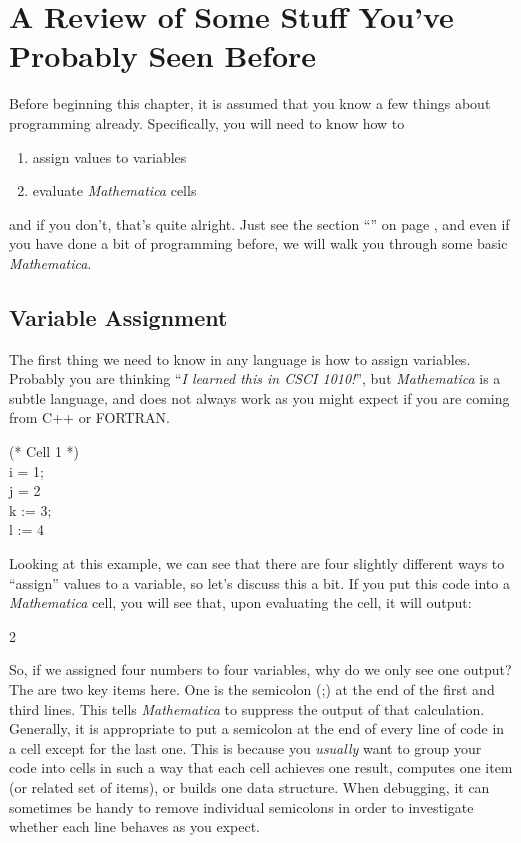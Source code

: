 \chapter[Stuff You've Seen Before]{A Review of Some Stuff You've Probably Seen Before}
\label{chap:SeenBefore}

Before beginning this chapter, it is assumed that you know a few things about programming already. Specifically, you will need to know how to
\begin{enumerate}
	   \item assign values to variables
	   \item evaluate \emph{Mathematica} cells
\end{enumerate}
and if you don't, that's quite alright. Just see the section ``\emph{}'' on page \pageref{chap:Prelim}, and even if you have done a bit of programming before, we will walk you through some basic \emph{Mathematica}.

\section{Variable Assignment}
The first thing we need to know in any language is how to assign variables. Probably you are thinking ``\emph{I learned this in CSCI 1010!}'', but \emph{Mathematica} is a subtle language, and does not always work as you might expect if you are coming from C++ or FORTRAN.

\begin{code}
	(* Cell 1 *)\\
	i = 1;\\
	j = 2\\
	k := 3;\\
	l := 4
\end{code}

Looking at this example, we can see that there are four slightly different ways to ``assign'' values to a variable, so let's discuss this a bit. If you put this code into a \emph{Mathematica} cell, you will see that, upon evaluating the cell, it will output:

\begin{code}
2
\end{code}

So, if we assigned four numbers to four variables, why do we only see one output? The are two key items here. One is the semicolon (;) at the end of the first and third lines. This tells \emph{Mathematica} to suppress the output of that calculation. Generally, it is appropriate to put a semicolon at the end of every line of code in a cell except for the last one. This is because you \emph{usually} want to group your code into cells in such a way that each cell achieves one result, computes one item (or related set of items), or builds one data structure. When debugging, it can sometimes be handy to remove individual semicolons in order to investigate whether each line behaves as you expect.

